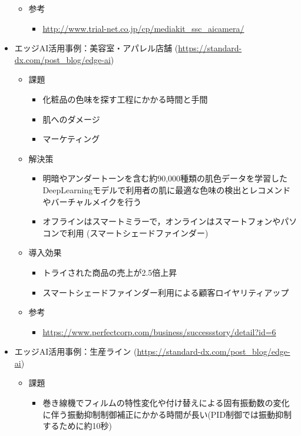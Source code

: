 \begin{itemize}
\begin{itemize}
\begin{itemize}
\begin{itemize}
			\end{itemize}
		\end{itemize}
		\item 参考
		\begin{itemize}
			\item \url{http://www.trial-net.co.jp/cp/mediakit_ssc_aicamera/}
		\end{itemize}
	\end{itemize}
	\item エッジAI活用事例：美容室・アパレル店舗 (\url{https://standard-dx.com/post_blog/edge-ai})
	\begin{itemize}
		\item 課題
		\begin{itemize}
			\item 化粧品の色味を探す工程にかかる時間と手間
			\item 肌へのダメージ
			\item マーケティング
		\end{itemize}
		\item 解決策
		\begin{itemize}
			\item 明暗やアンダートーンを含む約90,000種類の肌色データを学習したDeepLearningモデルで利用者の肌に最適な色味の検出とレコメンドやバーチャルメイクを行う
			\item オフラインはスマートミラーで，オンラインはスマートフォンやパソコンで利用 (スマートシェードファインダー)
		\end{itemize}
		\item 導入効果
		\begin{itemize}
			\item トライされた商品の売上が2.5倍上昇
			\item スマートシェードファインダー利用による顧客ロイヤリティアップ
		\end{itemize}
		\item 参考
		\begin{itemize}
			\item \url{https://www.perfectcorp.com/business/successstory/detail?id=6}
		\end{itemize}
	\end{itemize}
	\item エッジAI活用事例：生産ライン (\url{https://standard-dx.com/post_blog/edge-ai})
	\begin{itemize}
		\item 課題
		\begin{itemize}
			\item 巻き線機でフィルムの特性変化や付け替えによる固有振動数の変化に伴う振動抑制制御補正にかかる時間が長い(PID制御では振動抑制するために約10秒)

\end{itemize}
\end{itemize}
\end{itemize}
